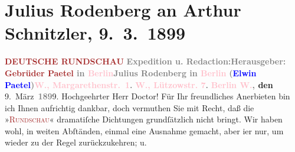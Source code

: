 

               \section[Julius Rodenberg an Arthur Schnitzler, 9. 3. 1899]{ Julius Rodenberg an Arthur Schnitzler, 9. 3. 1899}\nopagebreak{}\rehead{ }\normalsize\beginnumbering{} \toendnotes[C]{\smallbreak\pagebreak[2]} 
\toendnotes[C]{\smallbreak}\pstart
           \noindent{}\centering{}{\pb}\textcolor{gray}{\textbf{\textcolor{brown}{DEUTSCHE RUNDSCHAU}{}\ledrightnote{\textcolor{brown}{Deutsche Rundschau}}}}\pend
           \pstart
           \noindent{}\textcolor{gray}{\textbf{Expedition u. Redaction:}}\hfill \textcolor{gray}{\textbf{Herausgeber:}}\pend
           \pstart
           \textcolor{gray}{\textbf{\textcolor{brown}{Gebrüder Paetel}{}\ledrightnote{\textcolor{brown}{Gebrüder Paetel Verlag}} in \textcolor{pink}{Berlin}{}\ledrightnote{\textcolor{pink}{Berlin}}}}\hfill \textcolor{gray}{\textbf{Julius Rodenberg in \textcolor{pink}{Berlin}{}\ledrightnote{\textcolor{pink}{Berlin}}}}\pend
           \pstart
           \textcolor{gray}{\textbf{(\textcolor{blue}{Elwin
                                Paetel}{}\ledrightnote{\textcolor{blue}{Elwin Paetel}})}}\hfill \textcolor{gray}{\textbf{\textcolor{pink}{W., Margarethenstr. 1}{}\ledrightnote{\textcolor{pink}{Margaretenstraße}}.}}\pend
           \pstart
           \textcolor{gray}{\textbf{\textcolor{pink}{W., Lützowstr. 7}{}\ledrightnote{\textcolor{pink}{Lützowstraße}}.}}\pend
           \pstart
           \raggedleft{}\textbf{\textcolor{gray}{\textbf{\textcolor{pink}{Berlin W.}{}\ledrightnote{\textcolor{pink}{Berlin}},}} den}{ }9. März \textcolor{gray}{\textbf{189}}9.\pend
           \pstart{}Hochgeehrter Herr Doctor!\pend\pstart
           Für Ihr freundliches Anerbieten bin ich Ihnen aufrichtig dankbar, doch vermuthen
                    Sie mit Recht, daß die »\textcolor{brown}{\textsc{Rundschau}}{}\ledrightnote{\textcolor{brown}{Deutsche Rundschau}}« dramatiſche Dichtungen grundſätzlich nicht bringt. Wir haben wohl, in
                    weiten Abſtänden, einmal eine Ausnahme gemacht, aber i{\geminationm}er nur, um wieder zu der Regel zurückzukehren; u.
